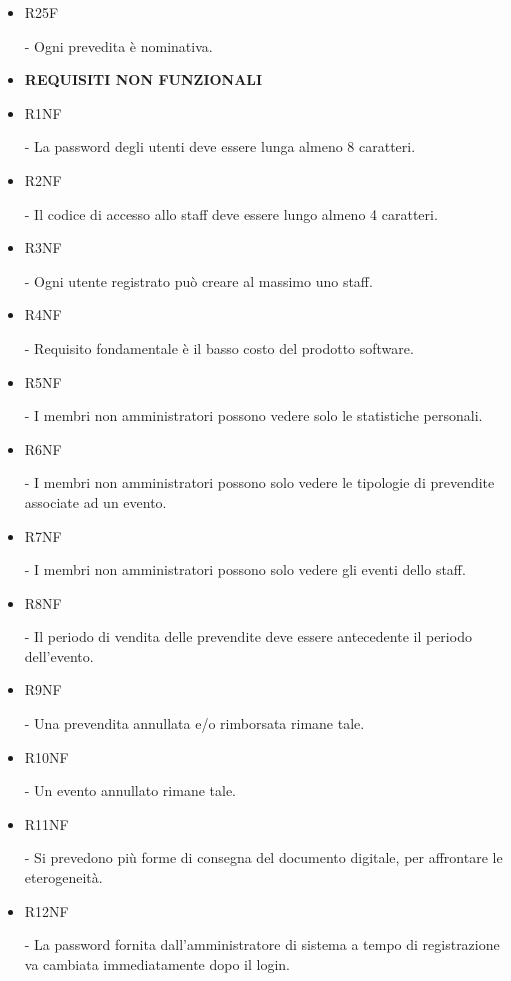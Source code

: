 \documentclass[a4paper]{article}
\begin{document}
\begin{itemize}
	\item \hypertarget{R25F}{R25F} - Ogni prevedita è nominativa.
	
	

	
	
		
    \item \textbf{REQUISITI NON FUNZIONALI}
	
	\item \hypertarget{R1NF}{R1NF} - La password degli utenti deve essere lunga almeno 8 caratteri.
	\item \hypertarget{R2NF}{R2NF} - Il codice di accesso allo staff deve essere lungo almeno 4 caratteri.
	\item \hypertarget{R3NF}{R3NF} - Ogni utente registrato può creare al massimo uno staff.
	\item \hypertarget{R4NF}{R4NF} - Requisito fondamentale è il basso costo del prodotto software.
	
	\item \hypertarget{R5NF}{R5NF} - I membri non amministratori possono vedere solo le statistiche personali.	
	\item \hypertarget{R6NF}{R6NF} - I membri non amministratori possono solo vedere le tipologie di prevendite associate ad un evento.
	\item \hypertarget{R7NF}{R7NF} - I membri non amministratori possono solo vedere gli eventi dello staff.
	\item \hypertarget{R8NF}{R8NF} - Il periodo di vendita delle prevendite deve essere antecedente il periodo dell'evento.
	\item \hypertarget{R9NF}{R9NF} - Una prevendita annullata e/o rimborsata rimane tale.
	\item \hypertarget{R10NF}{R10NF} - Un evento annullato rimane tale.
	\item \hypertarget{R11NF}{R11NF} - Si prevedono più forme di consegna del documento digitale, per affrontare le eterogeneità.
	\item \hypertarget{R12NF}{R12NF} - La password fornita dall'amministratore di sistema a tempo di registrazione va cambiata immediatamente dopo il login.
	

\end{itemize}
\end{document}
